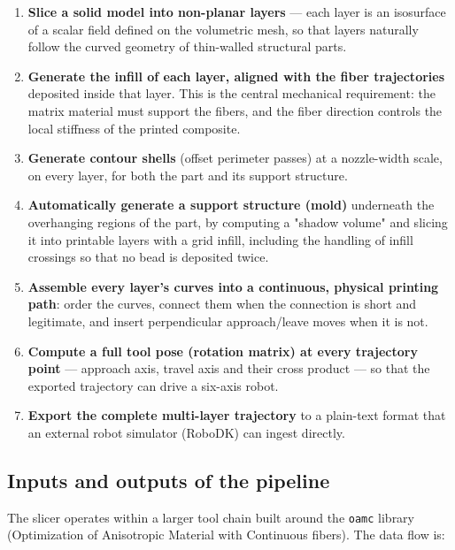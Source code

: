 \begin{enumerate}
  \item \textbf{Slice a solid model into non-planar layers} ---
        each layer is an isosurface of a scalar field defined on the
        volumetric mesh, so that layers naturally follow the curved
        geometry of thin-walled structural parts.
  \item \textbf{Generate the infill of each layer, aligned with the
        fiber trajectories} deposited inside that layer. This is the
        central mechanical requirement: the matrix material must support
        the fibers, and the fiber direction controls the local
        stiffness of the printed composite.
  \item \textbf{Generate contour shells} (offset perimeter passes) at a
        nozzle-width scale, on every layer, for both the part and its
        support structure.
  \item \textbf{Automatically generate a support structure (mold)}
        underneath the overhanging regions of the part, by computing a
        "shadow volume" and slicing it into printable layers with a
        grid infill, including the handling of infill crossings so
        that no bead is deposited twice.
  \item \textbf{Assemble every layer's curves into a continuous,
        physical printing path}: order the curves, connect them when the
        connection is short and legitimate, and insert perpendicular
        approach/leave moves when it is not.
  \item \textbf{Compute a full tool pose (rotation matrix) at every
        trajectory point} --- approach axis, travel axis and their
        cross product --- so that the exported trajectory can drive a
        six-axis robot.
  \item \textbf{Export the complete multi-layer trajectory} to a
        plain-text format that an external robot simulator (RoboDK) can
        ingest directly.
\end{enumerate}

\subsection{Inputs and outputs of the pipeline}

The slicer operates within a larger tool chain built around the
\texttt{oamc} library (Optimization of Anisotropic Material with
Continuous fibers). The data flow is:

